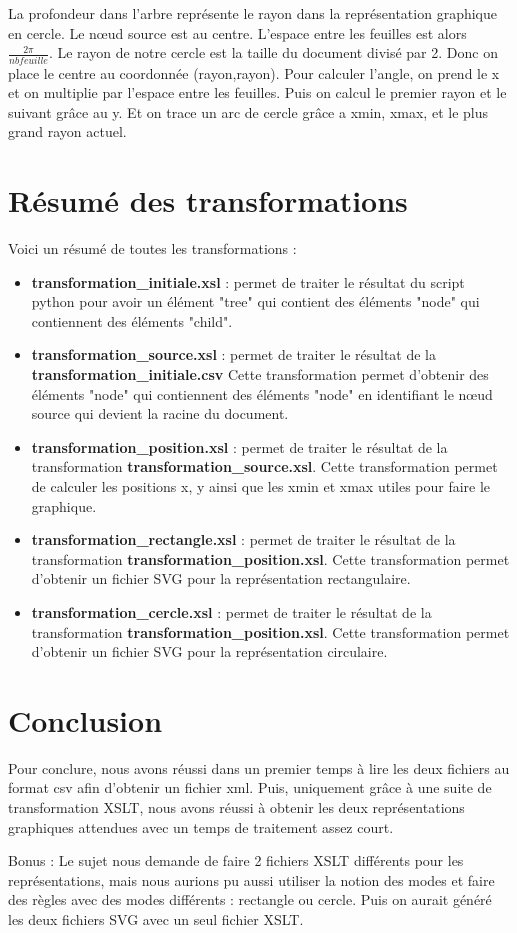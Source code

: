 \documentclass{article}
\begin{document}
La profondeur dans l'arbre représente le rayon dans la représentation graphique en cercle. Le nœud source est au centre. L'espace entre les feuilles est alors $ \frac{2\pi}{nbfeuille}$.
Le rayon de notre cercle est la taille du document divisé par 2. Donc on place le centre au coordonnée (rayon,rayon).
Pour calculer l'angle, on prend le x et on multiplie par l'espace entre les feuilles. Puis on calcul le premier rayon et le suivant grâce au y. Et on trace un arc de cercle grâce a xmin, xmax, et le plus grand rayon actuel.



\section{Résumé des transformations}
Voici un résumé de toutes les transformations :
\begin{itemize}
\item \textbf{transformation\_initiale.xsl} : permet de traiter le résultat du script python pour avoir un élément "tree" qui contient des éléments "node" qui contiennent des éléments "child".

\item \textbf{transformation\_source.xsl} : permet de traiter le résultat de la \textbf{transformation\_initiale.csv} Cette transformation permet d'obtenir des éléments "node" qui contiennent des éléments "node" en identifiant le nœud source qui devient la racine du document.

\item \textbf{transformation\_position.xsl} : permet de traiter le résultat de la transformation \textbf{transformation\_source.xsl}. Cette transformation permet de calculer les positions x, y ainsi que les xmin et xmax utiles pour faire le graphique.

\item \textbf{transformation\_rectangle.xsl} : permet de traiter le résultat de la transformation \textbf{transformation\_position.xsl}. Cette transformation permet d'obtenir un fichier SVG pour la représentation rectangulaire.

\item \textbf{transformation\_cercle.xsl} : permet de traiter le résultat de la transformation \textbf{transformation\_position.xsl}. Cette transformation permet d'obtenir un fichier SVG pour la représentation circulaire.

\end{itemize}

\section{Conclusion}
Pour conclure, nous avons réussi dans un premier temps à lire les deux fichiers au format csv afin d'obtenir un fichier xml. Puis, uniquement grâce à une suite de transformation XSLT, nous avons réussi à obtenir les deux représentations graphiques attendues avec un temps de traitement assez court.

Bonus : 
Le sujet nous demande de faire 2 fichiers XSLT différents pour les représentations, mais nous aurions pu aussi utiliser la notion des modes et faire des règles avec des modes différents : rectangle ou cercle.
Puis on aurait généré les deux fichiers SVG avec un seul fichier XSLT.
\end{document}

